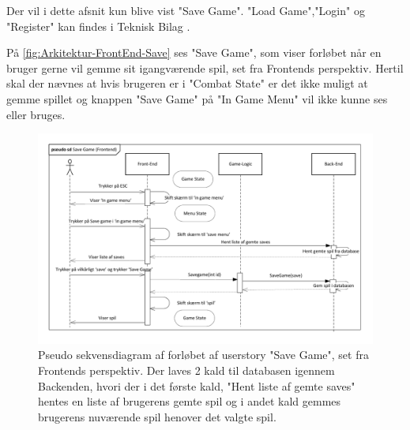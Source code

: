 Der vil i dette afsnit kun blive vist "Save Game". "Load Game","Login" og "Register" kan findes i Teknisk Bilag \parencite[][Section 7.2.1]{TekniskBilag}.

\noindent På \autoref{fig:Arkitektur-FrontEnd-Save} ses "Save Game", som viser forløbet når en bruger gerne vil gemme sit igangværende spil, set fra Frontends perspektiv. 
Hertil skal der nævnes at hvis brugeren er i "Combat State" er det ikke muligt at gemme spillet og knappen "Save Game" på "In Game Menu" vil ikke kunne ses eller bruges.\\

\begin{figure}[H]
\centering
\includegraphics[width = \textwidth]{02-Body/Images/Front-End_-_Arkitektur-savegame.pdf}
\caption{Pseudo sekvensdiagram af forløbet af userstory "Save Game", set fra Frontends perspektiv. Der laves 2 kald til databasen igennem Backenden, hvori der i det første kald,  "Hent liste af gemte saves" hentes en liste af brugerens gemte spil og i andet kald gemmes brugerens nuværende spil henover det valgte spil.}
\label{fig:Arkitektur-FrontEnd-Save}
\end{figure}

\newpage
